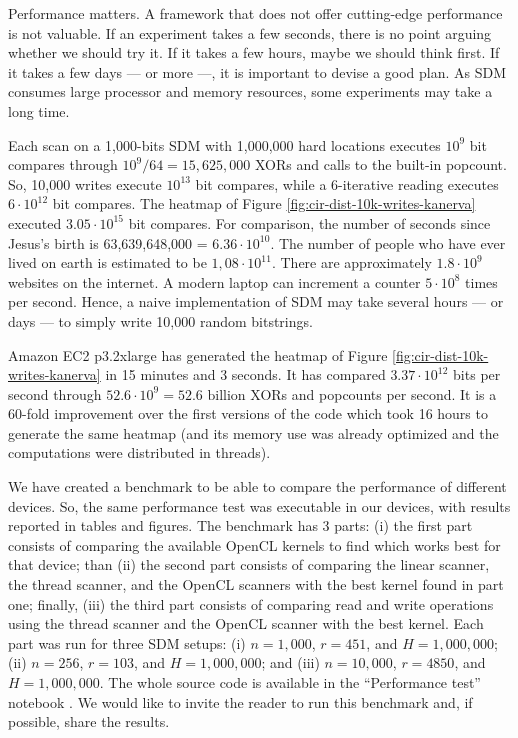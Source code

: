 
Performance matters. A framework that does not offer cutting-edge performance is not valuable.  If an experiment takes a few seconds, there is no point arguing whether we should try it. If it takes a few hours, maybe we should think first. If it takes a few days --- or more ---, it is important to devise a good plan.  As SDM consumes large processor and memory resources, some experiments may take a long time.

Each scan on a 1,000-bits SDM with 1,000,000 hard locations executes $10^9$ bit compares through $10^9/64 = 15,625,000$ XORs and calls to the built-in popcount. So, 10,000 writes execute $10^{13}$ bit compares, while a 6-iterative reading executes $6 \cdot 10^{12}$ bit compares. The heatmap of Figure \ref{fig:cir-dist-10k-writes-kanerva} executed $3.05 \cdot 10^{15}$ bit compares. For comparison, the number of seconds since Jesus's birth is 63,639,648,000 = $6.36 \cdot 10^{10}$. The number of people who have ever lived on earth is estimated to be $1,08 \cdot 10^{11}$. There are approximately $1.8 \cdot 10^{9}$ websites on the internet. A modern laptop can increment a counter $5 \cdot 10^{8}$ times per second. Hence, a naive implementation of SDM may take several hours --- or days --- to simply write 10,000 random bitstrings.

Amazon EC2 p3.2xlarge has generated the heatmap of Figure \ref{fig:cir-dist-10k-writes-kanerva} in 15 minutes and 3 seconds. It has compared $3.37 \cdot 10^{12}$ bits per second through $52.6 \cdot 10^{9} = 52.6 \text{ billion}$ XORs and popcounts per second. It is a 60-fold improvement over the first versions of the code which took 16 hours to generate the same heatmap (and its memory use was already optimized and the computations were distributed in threads).

We have created a benchmark to be able to compare the performance of different devices. So, the same performance test was executable in our devices, with results reported in tables and figures. The benchmark has 3 parts: (i) the first part consists of comparing the available OpenCL kernels to find which works best for that device; than (ii) the second part consists of comparing the linear scanner, the thread scanner, and the OpenCL scanners with the best kernel found in part one; finally, (iii) the third part consists of comparing read and write operations using the thread scanner and the OpenCL scanner with the best kernel. Each part was run for three SDM setups: (i) $n=1,000$, $r=451$, and $H=1,000,000$; (ii) $n=256$, $r=103$, and $H=1,000,000$; and (iii) $n=10,000$, $r=4850$, and $H=1,000,000$. The whole source code is available in the ``Performance test'' notebook \citep{sdmframework}. We would like to invite the reader to run this benchmark and, if possible, share the results.

